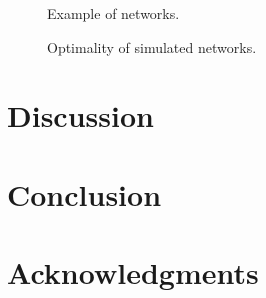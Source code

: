 \documentclass[runningheads,a4paper]{llncs2e/llncs}
\begin{document}
\begin{figure}
	
	\caption{Example of networks.}
\end{figure}




\begin{figure}
	
	\caption{Optimality of simulated networks.}
\end{figure}




\section{Discussion}




\section{Conclusion}






\section*{Acknowledgments}







%
\end{document}
